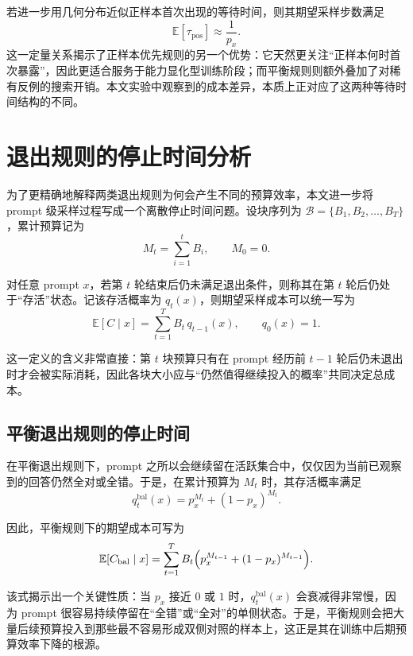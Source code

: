 若进一步用几何分布近似正样本首次出现的等待时间，则其期望采样步数满足
\begin{equation}
    \mathbb{E}[\tau_{\mathrm{pos}}]\approx \frac{1}{p_x}.
\end{equation}
这一定量关系揭示了正样本优先规则的另一个优势：它天然更关注“正样本何时首次暴露”，因此更适合服务于能力显化型训练阶段；而平衡规则则额外叠加了对稀有反例的搜索开销。本文实验中观察到的成本差异，本质上正对应了这两种等待时间结构的不同。

\section{退出规则的停止时间分析}

为了更精确地解释两类退出规则为何会产生不同的预算效率，本文进一步将 prompt 级采样过程写成一个离散停止时间问题。设块序列为 $\mathcal{B}=\{B_1,B_2,\ldots,B_T\}$，累计预算记为
\begin{equation}
    M_t=\sum_{i=1}^{t}B_i,\qquad M_0=0.
\end{equation}

对任意 prompt $x$，若第 $t$ 轮结束后仍未满足退出条件，则称其在第 $t$ 轮后仍处于“存活”状态。记该存活概率为 $q_t(x)$，则期望采样成本可以统一写为
\begin{equation}
    \mathbb{E}[C\mid x]=\sum_{t=1}^{T} B_t\, q_{t-1}(x),\qquad q_0(x)=1.
\end{equation}

这一定义的含义非常直接：第 $t$ 块预算只有在 prompt 经历前 $t-1$ 轮后仍未退出时才会被实际消耗，因此各块大小应与“仍然值得继续投入的概率”共同决定总成本。

\subsection{平衡退出规则的停止时间}

在平衡退出规则下，prompt 之所以会继续留在活跃集合中，仅仅因为当前已观察到的回答仍然全对或全错。于是，在累计预算为 $M_t$ 时，其存活概率满足
\begin{equation}
    q_t^{\mathrm{bal}}(x)=p_x^{M_t}+(1-p_x)^{M_t}.
\end{equation}

因此，平衡规则下的期望成本可写为
\begin{equation}
    \mathbb{E}[C_{\mathrm{bal}}\mid x]=\sum_{t=1}^{T}B_t\Bigl(p_x^{M_{t-1}}+(1-p_x)^{M_{t-1}}\Bigr).
\end{equation}

该式揭示出一个关键性质：当 $p_x$ 接近 $0$ 或 $1$ 时，$q_t^{\mathrm{bal}}(x)$ 会衰减得非常慢，因为 prompt 很容易持续停留在“全错”或“全对”的单侧状态。于是，平衡规则会把大量后续预算投入到那些最不容易形成双侧对照的样本上，这正是其在训练中后期预算效率下降的根源。

